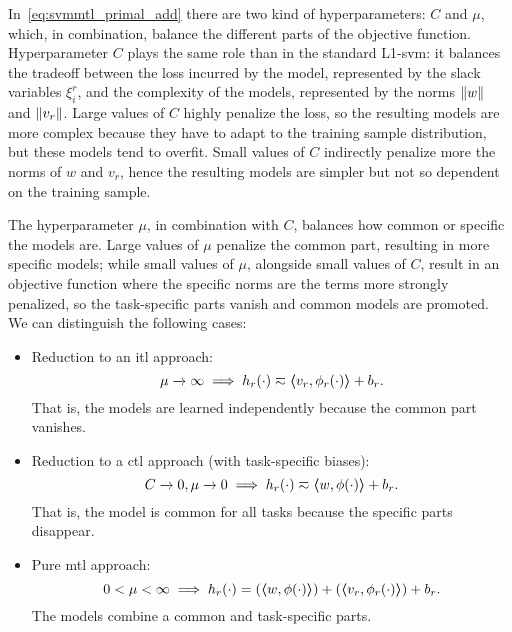 %
In~\eqref{eq:svmmtl_primal_add} there are two kind of hyperparameters: $C$ and $\mu$, which, in combination, balance the different parts of the objective function. 
%
Hyperparameter $C$ plays the same role than in the standard L1-\acrshort{svm}: it balances the tradeoff between the loss incurred by the model, represented by the slack variables $\xi_i^r$, and the complexity of the models, represented by the norms $\left\lVert{w}\right\rVert$ and $\left\lVert{v}_r\right\rVert$. Large values of $C$ highly penalize the loss, so the resulting models are more complex because they have to adapt to the training sample distribution, but these models tend to overfit. Small values of $C$ indirectly penalize more the norms of $w$ and $v_r$, hence the resulting models are simpler but not so dependent on the training sample.

%
The hyperparameter $\mu$, in combination with $C$, balances how common or specific the models are. 
Large values of $\mu$ penalize the common part, resulting in more specific models; while small values of $\mu$, alongside small values of $C$, result in an objective function where the specific norms are the terms more strongly penalized, so the task-specific parts vanish and common models are promoted.
We can distinguish the following cases:
\begin{itemize}
    \item Reduction to an \acrshort{itl} approach:
    $$\mu \xrightarrow[]{} \infty \implies h_r(\cdot) \eqsim \bm{\left\langle} {v}_r, \phi_r(\cdot) \bm{\right\rangle} + b_r .$$
    That is, the models are learned independently because the common part vanishes.
    \item Reduction to a \acrshort{ctl} approach (with task-specific biases): 
    $$C \xrightarrow[]{} 0, \mu \xrightarrow[]{} 0 \implies h_r(\cdot) \eqsim \bm{\left\langle} w, \phi(\cdot) \bm{\right\rangle} + b_r .$$
    That is, the model is common for all tasks because the specific parts disappear.
    \item Pure \acrshort{mtl} approach:
    $$ 0 < \mu < \infty \implies h_r(\cdot) =(\bm{\left\langle} w, \phi(\cdot) \bm{\right\rangle} ) + (\bm{\left\langle} {v}_r, \phi_r(\cdot) \bm{\right\rangle}) + b_r .$$
    The models combine a common and task-specific parts.
\end{itemize}

